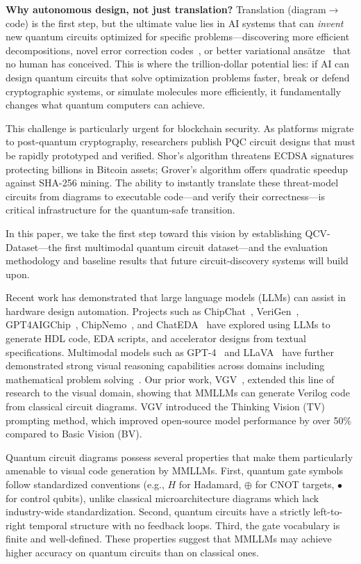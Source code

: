 \documentclass[conference]{IEEEtran}
\begin{document}
\textbf{Why autonomous design, not just translation?} Translation (diagram$\to$code) is the first step, but the ultimate value lies in AI systems that can \emph{invent} new quantum circuits optimized for specific problems---discovering more efficient decompositions, novel error correction codes~\cite{acharya2023suppressing}, or better variational ans\"{a}tze~\cite{cerezo2021variational} that no human has conceived. This is where the trillion-dollar potential lies: if AI can design quantum circuits that solve optimization problems faster, break or defend cryptographic systems, or simulate molecules more efficiently, it fundamentally changes what quantum computers can achieve.

This challenge is particularly urgent for blockchain security. As platforms migrate to post-quantum cryptography, researchers publish PQC circuit designs that must be rapidly prototyped and verified. Shor's algorithm threatens ECDSA signatures protecting billions in Bitcoin assets; Grover's algorithm offers quadratic speedup against SHA-256 mining. The ability to instantly translate these threat-model circuits from diagrams to executable code---and verify their correctness---is critical infrastructure for the quantum-safe transition.

In this paper, we take the first step toward this vision by establishing QCV-Dataset---the first multimodal quantum circuit dataset---and the evaluation methodology and baseline results that future circuit-discovery systems will build upon.

Recent work has demonstrated that large language models (LLMs) can assist in hardware design automation. Projects such as ChipChat~\cite{blocklove2023chipchat}, VeriGen~\cite{thakur2023verigen}, GPT4AIGChip~\cite{fu2023gpt4aigchip}, ChipNemo~\cite{liu2023chipnemo}, and ChatEDA~\cite{he2023chateda} have explored using LLMs to generate HDL code, EDA scripts, and accelerator designs from textual specifications. Multimodal models such as GPT-4~\cite{openai2023gpt4} and LLaVA~\cite{liu2023llava} have further demonstrated strong visual reasoning capabilities across domains including mathematical problem solving~\cite{lu2023mathvista}. Our prior work, VGV~\cite{wong2024vgv}, extended this line of research to the visual domain, showing that MMLLMs can generate Verilog code from classical circuit diagrams. VGV introduced the Thinking Vision (TV) prompting method, which improved open-source model performance by over 50\% compared to Basic Vision (BV).

Quantum circuit diagrams possess several properties that make them particularly amenable to visual code generation by MMLLMs. First, quantum gate symbols follow standardized conventions (e.g., $H$ for Hadamard, $\oplus$ for CNOT targets, $\bullet$ for control qubits), unlike classical microarchitecture diagrams which lack industry-wide standardization. Second, quantum circuits have a strictly left-to-right temporal structure with no feedback loops. Third, the gate vocabulary is finite and well-defined. These properties suggest that MMLLMs may achieve higher accuracy on quantum circuits than on classical ones.
\end{document}
